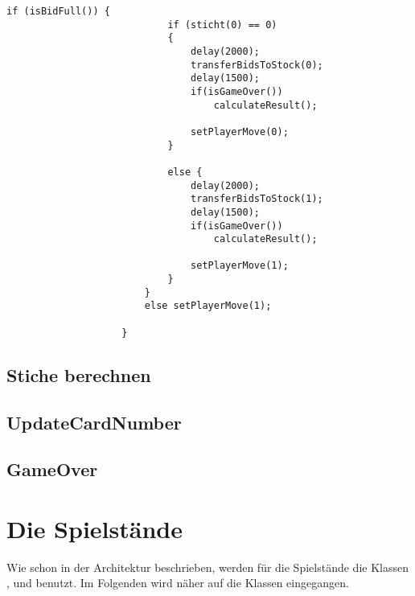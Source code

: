 \begin{lstlisting}[caption={initPlayers gamecycle},captionpos=b]
                    if (isBidFull()) {
                            if (sticht(0) == 0)
                            {
                                delay(2000);
                                transferBidsToStock(0);
                                delay(1500);
                                if(isGameOver())
                                    calculateResult();

                                setPlayerMove(0);
                            }

                            else {
                                delay(2000);
                                transferBidsToStock(1);
                                delay(1500);
                                if(isGameOver())
                                    calculateResult();

                                setPlayerMove(1);
                            }
                        }
                        else setPlayerMove(1);

                    }
\end{lstlisting}
\subsection{Stiche berechnen}

\subsection{UpdateCardNumber}

\subsection{GameOver}



\section{Die Spielstände}
\sectionauthor{\leonard}

Wie schon in der Architektur beschrieben, werden für die Spielstände die Klassen 
,  und  benutzt.
Im Folgenden wird näher auf die Klassen eingegangen.

